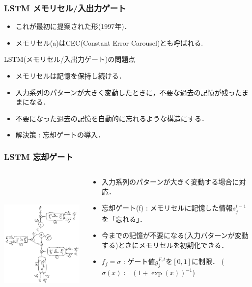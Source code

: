 \documentclass[dvipdfmx]{beamer}
\newcommand{\g}[2]{g_{#1}^{#2}}
\newcommand{\s}[2]{s_{#1}^{#2}}
\begin{document}
\begin{frame}
    \frametitle{LSTM \small{メモリセル/入出力ゲート}}
    \begin{itemize}
        \item これが最初に提案された形(1997年)．
        \item メモリセル(a)はCEC(Constant Error Carousel)とも呼ばれる.
    \end{itemize}

    \vspace{\baselineskip}

    LSTM(メモリセル/入出力ゲート)の問題点
    \begin{itemize}
        \item メモリセルは記憶を保持し続ける．
        \item 入力系列のパターンが大きく変動したときに，不要な過去の記憶が残ったままになる．
        \item 不要になった過去の記憶を自動的に忘れるような構造にする．
        \item 解決策 : 忘却ゲートの導入．
    \end{itemize}
\end{frame}


\begin{frame}
    \frametitle{LSTM \small{忘却ゲート}}
    \begin{columns}
        \begin{column}[T]{0.60\textwidth}
            \centering
            \includegraphics[width=7.2cm, height=7.2cm]{figure/lstm_fgate.png}
        \end{column}
        \begin{column}[T]{0.40\textwidth}
            \begin{itemize}
                \item 入力系列のパターンが大きく変動する場合に対応．
                \item 忘却ゲート(f) : メモリセルに記憶した情報$\s{j}{t-1}$を「忘れる」．
                \item 今までの記憶が不要になる(入力パターンが変動する)ときにメモリセルを初期化できる．
                \item $f_f = \sigma$ : ゲート値$\g{j}{F,t}$を$[0, 1]$に制限．
                {\footnotesize ($\sigma (x) \coloneqq (1 + \exp(x))^{-1}$)}
            \end{itemize}
        \end{column}
    \end{columns}
\end{frame}
\end{document}
